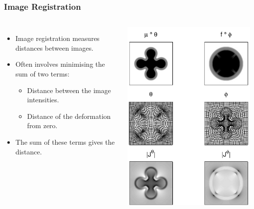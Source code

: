\begin{frame}
\frametitle{Image Registration}
\begin{columns}[c]
\begin{itemize}
\item Image registration measures distances between images.
\item Often involves minimising the sum of two terms:
\begin{itemize}
\item Distance between the image intensities.
\item Distance of the deformation from zero.
\end{itemize}
\item The sum of these terms gives the distance.
\end{itemize}
\includegraphics[width=\textwidth]{shoot2d}
\end{columns}
\end{frame}

